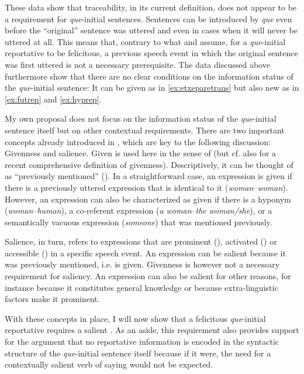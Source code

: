 These data show that traceability, in its current definition, does not appear to be a requirement for \emph{que}-initial sentences. Sentences can be introduced by \emph{que} even before the ``original'' sentence was  uttered and even in cases when  it will never be uttered at all. This means that, contrary to what  \citet{Etxepare2010} and \citet{Corr2016} assume, for a \emph{que}-initial reportative to be felicitous, a previous speech event in which the original sentence was first uttered is not a necessary prerequisite.  The data discussed above furthermore show that there are no clear conditions on the information status of the \emph{que}-initial sentence: It can be given as in \eqref{ex:etxeparetrans} but also new  as in \eqref{ex:futrep} and \eqref{ex:hyprep}. 



My own proposal does not focus on the information status of the \emph{que}-initial sentence itself but on other  contextual requirements. There are two important concepts already introduced in , which are key to the following discussion: Givenness and salience. Given is used here in the sense of \citet{Schwarzschild1999} (but cf. also \citealt{Rochemont2016} for a recent comprehensive definition of givenness). Descriptively, it can be thought of as ``previously mentioned'' (\citealt{Buering2003}). In a straightforward case, an expression is given if there is a previously uttered expression that is identical to it (\emph{woman}–\emph{woman}). However, an expression  can also be characterized as given if there is a hyponym (\emph{woman}–\emph{human}), a co-referent expression (\emph{a woman}–\emph{the woman/she}), or a  semantically vacuous expression (\emph{someone}) that was  mentioned previously.

Salience, in turn, refers  to expressions that are prominent (\citealt{Chiarcos2011}),  activated (\citealt{Chafe1976}) or accessible (\citealt{Ariel1990})  in a specific speech event. An expression can be salient because it was previously mentioned, i.e. is given.  Givenness is however not a necessary requirement for saliency. An expression can also  be salient for other reasons, for instance because it constitutes general knowledge or because extra-linguistic factors make it prominent.

With these concepts in place, I will now show that a felicitous \emph{que}-initial reportative requires a salient \emph{}. As an aside, this requirement also provides support for the argument  that no reportative information is encoded in the syntactic structure of the \emph{que}-initial sentence itself because if it were, the need  for a contextually salient verb of saying would not be expected.

